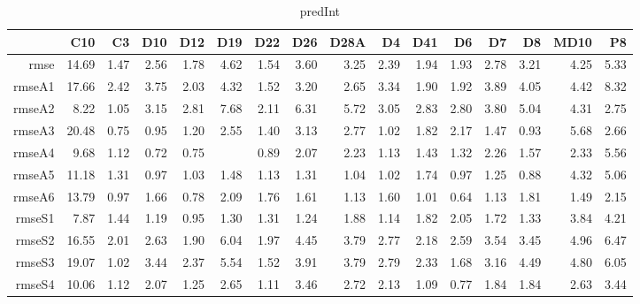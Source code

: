 \begin{table}[H]
\centering
\begin{tabular}{rrrrrrrrrrrrrrrr}
  \hline
 & C10 & C3 & D10 & D12 & D19 & D22 & D26 & D28A & D4 & D41 & D6 & D7 & D8 & MD10 & P8 \\ 
  \hline
rmse & 14.69 & 1.47 & 2.56 & 1.78 & 4.62 & 1.54 & 3.60 & 3.25 & 2.39 & 1.94 & 1.93 & 2.78 & 3.21 & 4.25 & 5.33 \\ 
  rmseA1 & 17.66 & 2.42 & 3.75 & 2.03 & 4.32 & 1.52 & 3.20 & 2.65 & 3.34 & 1.90 & 1.92 & 3.89 & 4.05 & 4.42 & 8.32 \\ 
  rmseA2 & 8.22 & 1.05 & 3.15 & 2.81 & 7.68 & 2.11 & 6.31 & 5.72 & 3.05 & 2.83 & 2.80 & 3.80 & 5.04 & 4.31 & 2.75 \\ 
  rmseA3 & 20.48 & 0.75 & 0.95 & 1.20 & 2.55 & 1.40 & 3.13 & 2.77 & 1.02 & 1.82 & 2.17 & 1.47 & 0.93 & 5.68 & 2.66 \\ 
  rmseA4 & 9.68 & 1.12 & 0.72 & 0.75 &  & 0.89 & 2.07 & 2.23 & 1.13 & 1.43 & 1.32 & 2.26 & 1.57 & 2.33 & 5.56 \\ 
  rmseA5 & 11.18 & 1.31 & 0.97 & 1.03 & 1.48 & 1.13 & 1.31 & 1.04 & 1.02 & 1.74 & 0.97 & 1.25 & 0.88 & 4.32 & 5.06 \\ 
  rmseA6 & 13.79 & 0.97 & 1.66 & 0.78 & 2.09 & 1.76 & 1.61 & 1.13 & 1.60 & 1.01 & 0.64 & 1.13 & 1.81 & 1.49 & 2.15 \\ 
  rmseS1 & 7.87 & 1.44 & 1.19 & 0.95 & 1.30 & 1.31 & 1.24 & 1.88 & 1.14 & 1.82 & 2.05 & 1.72 & 1.33 & 3.84 & 4.21 \\ 
  rmseS2 & 16.55 & 2.01 & 2.63 & 1.90 & 6.04 & 1.97 & 4.45 & 3.79 & 2.77 & 2.18 & 2.59 & 3.54 & 3.45 & 4.96 & 6.47 \\ 
  rmseS3 & 19.07 & 1.02 & 3.44 & 2.37 & 5.54 & 1.52 & 3.91 & 3.79 & 2.79 & 2.33 & 1.68 & 3.16 & 4.49 & 4.80 & 6.05 \\ 
  rmseS4 & 10.06 & 1.12 & 2.07 & 1.25 & 2.65 & 1.11 & 3.46 & 2.72 & 2.13 & 1.09 & 0.77 & 1.84 & 1.84 & 2.63 & 3.44 \\ 
   \hline
\end{tabular}
\caption{predInt} 
\end{table}
